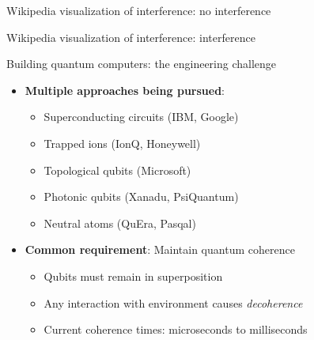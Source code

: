 \documentclass[aspectratio=169, lualatex]{beamer} %
\def\enrouge#1{\textcolor{rouge}{#1}}
\begin{document}
\begin{frame}{Wikipedia visualization of interference: no interference}
\end{frame}

\begin{frame}{Wikipedia visualization of interference: interference}
\end{frame}

\begin{frame}{Building quantum computers: the engineering challenge}
	\begin{itemize}
		\item \textbf{Multiple approaches being pursued}:
		      \begin{itemize}
			      \item Superconducting circuits (IBM, Google)
			      \item Trapped ions (IonQ, Honeywell)
			      \item Topological qubits (Microsoft)
			      \item Photonic qubits (Xanadu, PsiQuantum)
			      \item Neutral atoms (QuEra, Pasqal)
		      \end{itemize}
		\item \textbf{Common requirement}: Maintain quantum coherence
		      \begin{itemize}
			      \item Qubits must remain in superposition
			      \item \enrouge{Any interaction with environment causes \textit{decoherence}}
			      \item Current coherence times: microseconds to milliseconds
		      \end{itemize}
	\end{itemize}
\end{frame}
\end{document}
